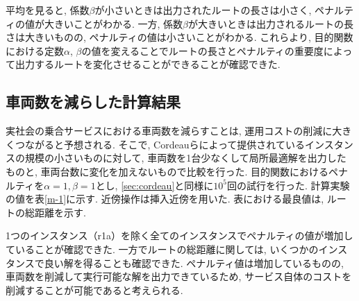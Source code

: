 平均を見ると, 係数$\beta$が小さいときは出力されたルートの長さは小さく, ペナルティの値が大きいことがわかる. 一方, 係数$\beta$が大きいときは出力されるルートの長さは大きいものの, ペナルティの値は小さいことがわかる. これらより, 目的関数における定数$\alpha$, $\beta$の値を変えることでルートの長さとペナルティの重要度によって出力するルートを変化させることができることが確認できた.

\subsection{車両数を減らした計算結果}
実社会の乗合サービスにおける車両数を減らすことは, 運用コストの削減に大きくつながると予想される. そこで, Cordeauらによって提供されているインスタンスの規模の小さいものに対して, 車両数を1台少なくして局所最適解を出力したものと, 車両台数に変化を加えないもので比較を行った. 目的関数におけるペナルティを$\alpha=1, \beta=1$とし, \ref{sec:cordeau}と同様に$10^5$回の試行を行った. 計算実験の値を表\ref{m-1}に示す. 近傍操作は挿入近傍を用いた. 表における最良値は, ルートの総距離を示す.

1つのインスタンス（r1a）を除く全てのインスタンスでペナルティの値が増加していることが確認できた. 一方でルートの総距離に関しては, いくつかのインスタンスで良い解を得ることも確認できた. ペナルティ値は増加しているものの, 車両数を削減して実行可能な解を出力できているため, サービス自体のコストを削減することが可能であると考えられる.

